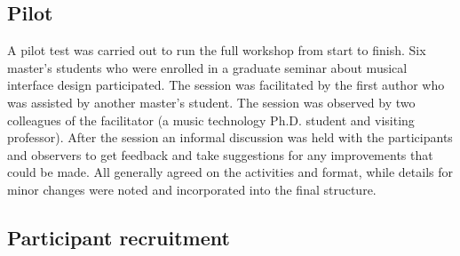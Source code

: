 \documentclass[letterpaper, 12pt]{article}
\begin{document}
\subsection{Pilot}
\label{sec:pilot}

A pilot test was carried out to run the full workshop from start to finish. Six master's students who were enrolled in a graduate seminar about musical interface design participated. The session was facilitated by the first author who was assisted by another master's student.
The session was observed by two colleagues of the facilitator (a music technology Ph.D. student and visiting professor). After the session an informal discussion was held with the participants and observers to get feedback and take suggestions for any improvements that could be made. All generally agreed on the activities and format, while details for minor changes were noted and incorporated into the final structure.  


\subsection{Participant recruitment}
\label{sec:participant-criteria-and-selection}

\end{document}
